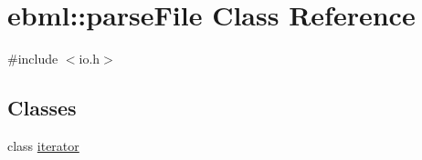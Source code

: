\hypertarget{classebml_1_1parseFile}{}\section{ebml\+:\+:parse\+File Class Reference}
\label{classebml_1_1parseFile}


{\ttfamily \#include $<$io.\+h$>$}

\subsection*{Classes}
\begin{DoxyCompactItemize}
\item 
class \mbox{\hyperlink{classebml_1_1parseFile_1_1iterator}{iterator}}
\end{DoxyCompactItemize}
